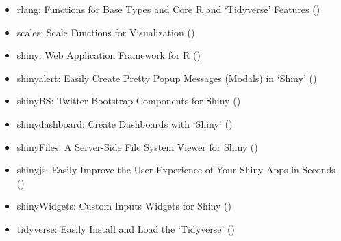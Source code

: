 \documentclass[
]{book}
\begin{document}
\begin{itemize}
\item
  rlang: Functions for Base Types and Core R and `Tidyverse' Features (\citet{R-rlang})
\item
  scales: Scale Functions for Visualization (\citet{R-scales})
\item
  shiny: Web Application Framework for R (\citet{R-shiny})
\item
  shinyalert: Easily Create Pretty Popup Messages (Modals) in `Shiny' (\citet{R-shinyalert})
\item
  shinyBS: Twitter Bootstrap Components for Shiny (\citet{R-shinyBS})
\item
  shinydashboard: Create Dashboards with `Shiny' (\citet{R-shinydashboard})
\item
  shinyFiles: A Server-Side File System Viewer for Shiny (\citet{R-shinyFiles})
\item
  shinyjs: Easily Improve the User Experience of Your Shiny Apps in Seconds (\citet{R-shinyjs})
\item
  shinyWidgets: Custom Inputs Widgets for Shiny (\citet{R-shinyWidgets})
\item
  tidyverse: Easily Install and Load the `Tidyverse' (\citet{R-tidyverse})
\end{itemize}

  
\end{document}
